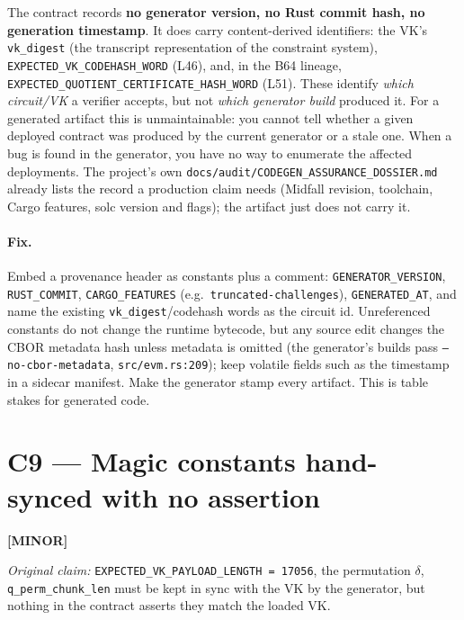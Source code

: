 The contract records \textbf{no generator version, no Rust commit
hash, no generation timestamp}. It does carry content-derived
identifiers: the VK's \texttt{vk\_digest} (the transcript
representation of the constraint system), \texttt{EXPECTED\_\allowbreak{}VK\_\allowbreak{}CODEHASH\_\allowbreak{}WORD}
(L46), and, in the B64 lineage, \texttt{EXPECTED\_\allowbreak{}QUOTIENT\_\allowbreak{}CERTIFICATE\_\allowbreak{}HASH\_\allowbreak{}WORD}
(L51). These identify \emph{which circuit/VK} a verifier accepts,
but not \emph{which generator build} produced it. For a generated
artifact this is unmaintainable: you cannot tell whether a given
deployed contract was produced by the current generator or a
stale one. When a bug is found in the generator, you have
no way to enumerate the affected deployments. The project's own
\texttt{docs/\allowbreak{}audit/\allowbreak{}CODEGEN\_\allowbreak{}ASSURANCE\_\allowbreak{}DOSSIER.md} already lists the
record a production claim needs (Midfall revision, toolchain, Cargo
features, solc version and flags); the artifact just does not carry it.

\paragraph{Fix.}
Embed a provenance header as constants plus a comment:
\texttt{GENERATOR\_\allowbreak{}VERSION}, \texttt{RUST\_COMMIT},
\texttt{CARGO\_FEATURES} (e.g.\ \texttt{truncated-challenges}),
\texttt{GENERATED\_AT}, and name the existing
\texttt{vk\_digest}/codehash words as the circuit id. Unreferenced
constants do not change the runtime bytecode, but any source edit
changes the CBOR metadata hash unless metadata is omitted (the
generator's builds pass \texttt{--no-cbor-metadata},
\texttt{src/evm.rs:209}); keep volatile fields such as the timestamp
in a sidecar manifest. Make the
generator stamp every artifact. This is table stakes for
generated code.

\section{C9 --- Magic constants hand-synced with no assertion}
\label{sec:c9-magic}
\textcolor{codegenblue}{\textbf{[MINOR]}} 

\emph{Original claim:} \texttt{EXPECTED\_\allowbreak{}VK\_\allowbreak{}PAYLOAD\_\allowbreak{}LENGTH = 17056}, the permutation
$\delta$, \texttt{q\_\allowbreak{}perm\_\allowbreak{}chunk\_\allowbreak{}len} must be kept in
sync with the VK by the generator, but nothing in the
contract asserts they match the loaded VK.

